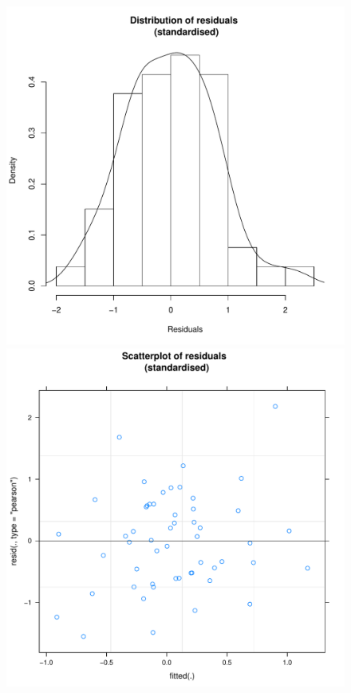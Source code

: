 \begin{figure}[htbp]
    \includegraphics[scale =.4]{images/TEM23Hist.pdf}
    \includegraphics[scale =.4]{images/TEM23Scatter.pdf}

\end{figure}
